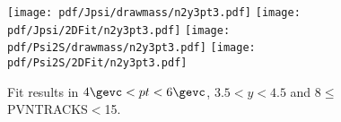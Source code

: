 \begin{figure}[H]
\begin{center}
\texttt{[image: pdf/Jpsi/drawmass/n2y3pt3.pdf]}
\texttt{[image: pdf/Jpsi/2DFit/n2y3pt3.pdf]}
\vspace*{-0.5cm}
\texttt{[image: pdf/Psi2S/drawmass/n2y3pt3.pdf]}
\texttt{[image: pdf/Psi2S/2DFit/n2y3pt3.pdf]}
\vspace*{-0.5cm}
\end{center}
\caption{Fit results in $4\gevc<pt<6\gevc$, $3.5<y<4.5$ and 8$\leq$PVNTRACKS$<$15.}
\label{Fitn2y3pt3}
\end{figure}
